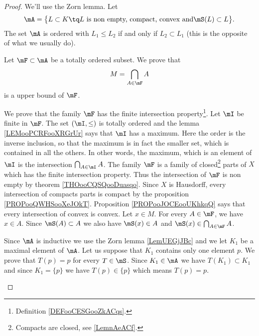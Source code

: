 \begin{proof}
	We'll use the Zorn lemma. Let
	\begin{equation}
		\mA=\big\{  L\subset K\tq L \text{ is non empty, compact, convex and} \mS(L)\subset L   \big\}.
	\end{equation}
	The set \( \mA\) is ordered with \( L_1\leq L_2\) if and only if \( L_2\subset L_1\) (this is the opposite of what we usually do).

	\begin{subproof}
		Let \( \mF\subset \mA\) be a totally ordered subset. We prove that
		\begin{equation}
			M=\bigcap_{A\in \mF}A
		\end{equation}
		is a upper bound of \( \mF\).
		\begin{subproof}
			We prove that the family \( \mF\) has the finite intersection property\footnote{Definition \ref{DEFooCESGooZkACqs}.}. Let \( \mI\) be finite in \( \mF\). The set \( (\mI,\leq)\) is totally ordered and the lemma \ref{LEMooPCRFooXRGrUr} says that \( \mI\) has a maximum. Here the order is the inverse inclusion, so that the maximum is in fact the smaller set, which is contained in all the others. In other words, the maximum, which is an element of \( \mI\) is the intersection \( \bigcap_{A\in\mI}A\).
			The family \( \mF\) is a family of closed\footnote{Compacts are closed, see \ref{LemnAeACf}.} parts of \( X\) which has the finite intersection property. Thus the intersection of \( \mF\) is non empty by theorem \ref{THOooCQSQooDuasqo}.
			\spitem[\( M\) is compact]
			Since \( X\) is Hausdorff, every intersection of compacts parts is compact by the proposition \ref{PROPooQWHSooXeJOkT}.
			\spitem[\( M\) is convex]
			Proposition \ref{PROPooJOCEooUKhkqQ} says that every intersection of convex is convex.
			\spitem[\( \mS(M)\subset\mS(M)\)]
			Let \( x\in M\). For every \( A\in \mF\), we have \( x\in A\). Since \( \mS(A)\subset A\) we also have \( \mS(x)\in A\) and \( \mS(x)\in \bigcap_{A\in\mF}A\).
		\end{subproof}
		Since \( \mA\) is inductive we use the Zorn lemma \ref{LemUEGjJBc} and we let \( K_1\) be a maximal element of \( \mA\).
		Let us suppose that \( K_1\) contains only one element \( p\). We prove that \( T(p)=p\) for every \( T\in\mS\). Since \( K_1\in \mA\) we have \( T(K_1)\subset K_1\) and since \( K_1=\{ p \}\) we have \( T(p)\in \{ p \}\) which means \( T(p)=p\).

\end{subproof}
\end{proof}
